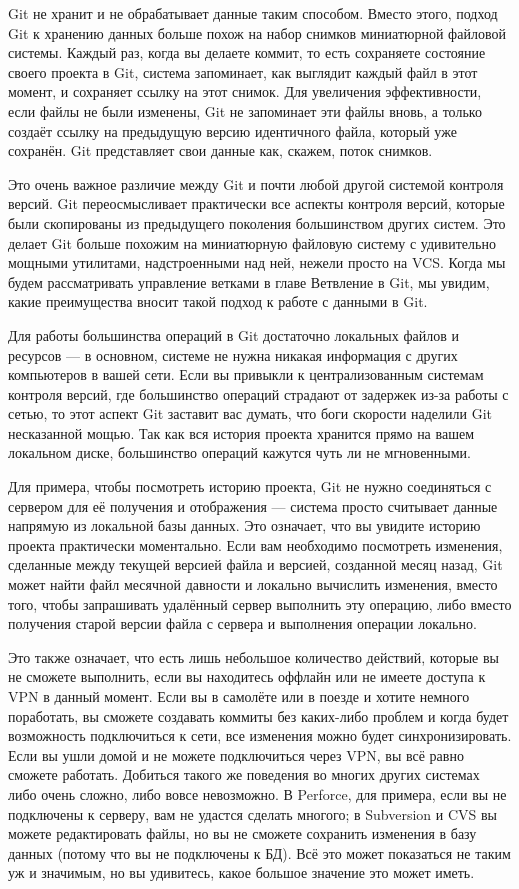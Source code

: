 Git не хранит и не обрабатывает данные таким способом. Вместо этого, подход Git к хранению данных больше похож на набор снимков миниатюрной файловой системы. Каждый раз, когда вы делаете коммит, то есть сохраняете состояние своего проекта в Git, система запоминает, как выглядит каждый файл в этот момент, и сохраняет ссылку на этот снимок. Для увеличения эффективности, если файлы не были изменены, Git не запоминает эти файлы вновь, а только создаёт ссылку на предыдущую версию идентичного файла, который уже сохранён. Git представляет свои данные как, скажем, поток снимков.

Это очень важное различие между Git и почти любой другой системой контроля версий. Git переосмысливает практически все аспекты контроля версий, которые были скопированы из предыдущего поколения большинством других систем. Это делает Git больше похожим на миниатюрную файловую систему с удивительно мощными утилитами, надстроенными над ней, нежели просто на VCS. Когда мы будем рассматривать управление ветками в главе Ветвление в Git, мы увидим, какие преимущества вносит такой подход к работе с данными в Git.

Для работы большинства операций в Git достаточно локальных файлов и ресурсов —  в основном, системе не нужна никакая информация с других компьютеров в вашей сети. Если вы привыкли к централизованным системам контроля версий, где большинство операций страдают от задержек из-за работы с сетью, то этот аспект Git заставит вас думать, что боги скорости наделили Git несказанной мощью. Так как вся история проекта хранится прямо на вашем локальном диске, большинство операций кажутся чуть ли не мгновенными.

Для примера, чтобы посмотреть историю проекта, Git не нужно соединяться с сервером для её получения и отображения — система просто считывает данные напрямую из локальной базы данных. Это означает, что вы увидите историю проекта практически моментально. Если вам необходимо посмотреть изменения, сделанные между текущей версией файла и версией, созданной месяц назад, Git может найти файл месячной давности и локально вычислить изменения, вместо того, чтобы запрашивать удалённый сервер выполнить эту операцию, либо вместо получения старой версии файла с сервера и выполнения операции локально.

Это также означает, что есть лишь небольшое количество действий, которые вы не сможете выполнить, если вы находитесь оффлайн или не имеете доступа к VPN в данный момент. Если вы в самолёте или в поезде и хотите немного поработать, вы сможете создавать коммиты без каких-либо проблем и когда будет возможность подключиться к сети, все изменения можно будет синхронизировать. Если вы ушли домой и не можете подключиться через VPN, вы всё равно сможете работать.
Добиться такого же поведения во многих других системах либо очень сложно, либо вовсе невозможно. В Perforce, для примера, если вы не подключены к серверу, вам не удастся сделать многого; в Subversion и CVS вы можете редактировать файлы, но вы не сможете сохранить изменения в базу данных (потому что вы не подключены к БД). Всё это может показаться не таким уж и значимым, но вы удивитесь, какое большое значение это может
иметь.


